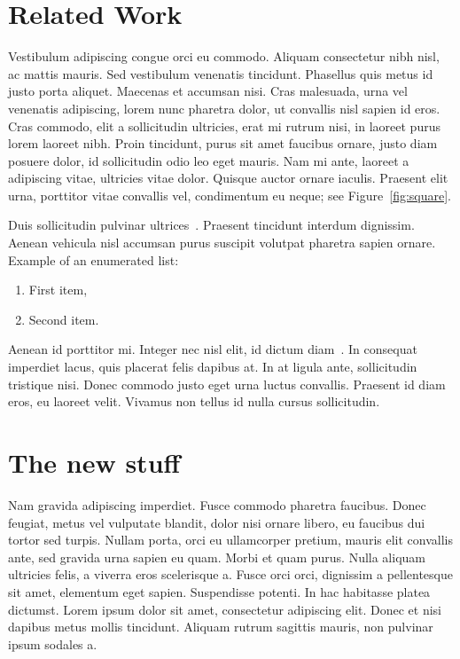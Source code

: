 \documentclass[submission]{gmp2018}
\begin{document}

\section{Related Work}\label{sec:relatedwork}

Vestibulum adipiscing congue orci eu commodo. Aliquam consectetur nibh nisl, ac mattis mauris. Sed vestibulum venenatis tincidunt. Phasellus quis metus id justo porta aliquet. Maecenas et accumsan nisi. Cras malesuada, urna vel venenatis adipiscing, lorem nunc pharetra dolor, ut convallis nisl sapien id eros. Cras commodo, elit a sollicitudin ultricies, erat mi rutrum nisi, in laoreet purus lorem laoreet nibh. Proin tincidunt, purus sit amet faucibus ornare, justo diam posuere dolor, id sollicitudin odio leo eget mauris. Nam mi ante, laoreet a adipiscing vitae, ultricies vitae dolor. Quisque auctor ornare iaculis. Praesent elit urna, porttitor vitae convallis vel, condimentum eu neque; see Figure~\ref{fig:square}.

Duis sollicitudin pulvinar ultrices~\cite{Peters:1997:BBC}. Praesent tincidunt interdum dignissim. Aenean vehicula nisl accumsan purus suscipit volutpat pharetra sapien ornare.
%
Example of an enumerated list:
\begin{enumerate}
  \item First item,
  \item Second item.
\end{enumerate}

Aenean id porttitor mi. Integer nec nisl elit, id dictum diam~\cite{Kazhdan:2008:SMF}. In consequat imperdiet lacus, quis placerat felis dapibus at. In at ligula ante, sollicitudin tristique nisi. Donec commodo justo eget urna luctus convallis. Praesent id diam eros, eu laoreet velit. Vivamus non tellus id nulla cursus sollicitudin.


\section{The new stuff}

Nam gravida adipiscing imperdiet. Fusce commodo pharetra faucibus. Donec feugiat, metus vel vulputate blandit, dolor nisi ornare libero, eu faucibus dui tortor sed turpis. Nullam porta, orci eu ullamcorper pretium, mauris elit convallis ante, sed gravida urna sapien eu quam. Morbi et quam purus. Nulla aliquam ultricies felis, a viverra eros scelerisque a. Fusce orci orci, dignissim a pellentesque sit amet, elementum eget sapien. Suspendisse potenti. In hac habitasse platea dictumst. Lorem ipsum dolor sit amet, consectetur adipiscing elit. Donec et nisi dapibus metus mollis tincidunt. Aliquam rutrum sagittis mauris, non pulvinar ipsum sodales a.
\end{document}
